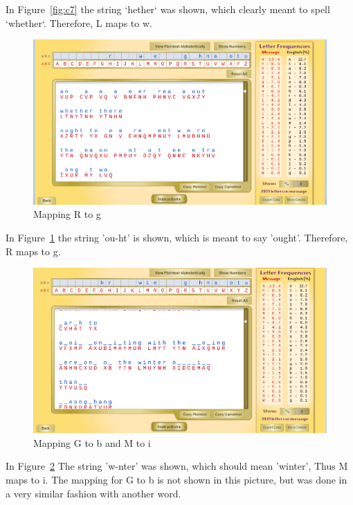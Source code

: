 \documentclass[12pt]{article}
\begin{document}
In Figure~\ref{fig:c7} the string `hether` was shown, which clearly meant to spell `whether`. Therefore, L maps to w.

\begin{figure}[H]
    \begin{center}
        \includegraphics[scale=0.48]{c8.png}
    \end{center}{}
    \caption{Mapping R to g}
    \label{fig:c8}
\end{figure}

In Figure~\ref{fig:c8} the string 'ou-ht' is shown, which is meant to say 'ought'. Therefore, R maps to g.

\begin{figure}[H]
    \begin{center}
        \includegraphics[scale=0.48]{c9.png}
    \end{center}{}
    \caption{Mapping G to b and M to i}
    \label{fig:c9}
\end{figure}

In Figure~\ref{fig:c9} The string 'w-nter' was shown, which should mean 'winter', Thus M maps to i. The mapping for G to b is not shown in this picture, but was done in a very similar fashion with another word.
\end{document}

